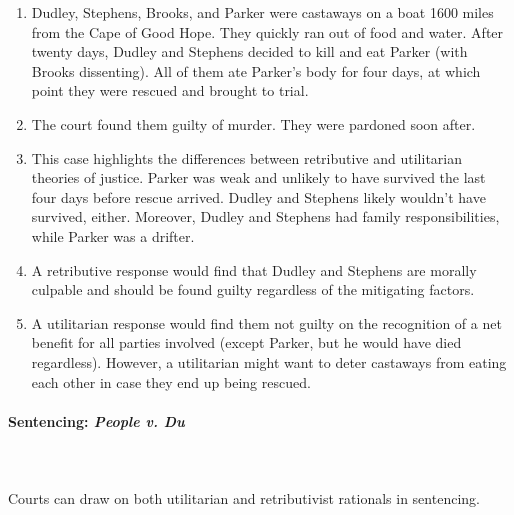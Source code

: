 \begin{enumerate}
    \item Dudley, Stephens, Brooks, and Parker were castaways on a boat 1600 
    miles from the Cape of Good Hope. They quickly ran out of food and water. 
    After twenty days, Dudley and Stephens decided to kill and eat Parker 
    (with Brooks dissenting). All of them ate Parker's body for four days, at 
    which point they were rescued and brought to trial.
    \item The court found them guilty of murder. They were pardoned soon 
    after.
    \item This case highlights the differences between retributive and 
    utilitarian theories of justice. Parker was weak and unlikely to have 
    survived the last four days before rescue arrived. Dudley and Stephens 
    likely wouldn't have survived, either. Moreover, Dudley and Stephens had 
    family responsibilities, while Parker was a drifter.
    \item A retributive response would find that Dudley and Stephens are 
    morally culpable and should be found guilty regardless of the mitigating 
    factors.
    \item A utilitarian response would find them not guilty on the recognition 
    of a net benefit for all parties involved (except Parker, but he would 
    have died regardless). However, a utilitarian might want to deter 
    castaways from eating each other in case they end up being rescued.
\end{enumerate}

\paragraph{Sentencing: \emph{People v. Du}}
~\\\\
Courts can draw on both utilitarian and retributivist rationals in sentencing.

